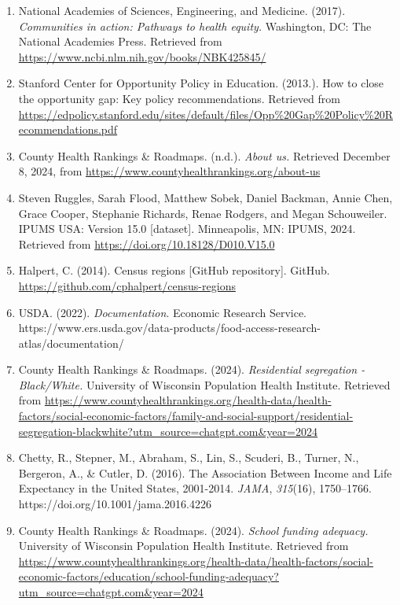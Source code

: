\documentclass[
  10pt,
  letterpaper,
  DIV=11,
  numbers=noendperiod]{scrartcl}
\begin{document}
\begin{enumerate}
\def\labelenumi{\arabic{enumi}.}
\item
  National Academies of Sciences, Engineering, and Medicine. (2017).
  \emph{Communities in action: Pathways to health equity.} Washington,
  DC: The National Academies Press. Retrieved from
  \url{https://www.ncbi.nlm.nih.gov/books/NBK425845/}
\item
  Stanford Center for Opportunity Policy in Education. (2013.). How to
  close the opportunity gap: Key policy recommendations. Retrieved from
  \url{https://edpolicy.stanford.edu/sites/default/files/Opp\%20Gap\%20Policy\%20Recommendations.pdf}
\item
  County Health Rankings \& Roadmaps. (n.d.). \emph{About us.} Retrieved
  December 8, 2024, from
  \url{https://www.countyhealthrankings.org/about-us}
\item
  Steven Ruggles, Sarah Flood, Matthew Sobek, Daniel Backman, Annie
  Chen, Grace Cooper, Stephanie Richards, Renae Rodgers, and Megan
  Schouweiler. IPUMS USA: Version 15.0 {[}dataset{]}. Minneapolis, MN:
  IPUMS, 2024. Retrieved from \url{https://doi.org/10.18128/D010.V15.0}
\item
  Halpert, C. (2014). Census regions {[}GitHub repository{]}. GitHub.
  \url{https://github.com/cphalpert/census-regions}
\item
  USDA. (2022). \emph{Documentation}. Economic Research Service.
  https://www.ers.usda.gov/data-products/food-access-research-atlas/documentation/
\item
  County Health Rankings \& Roadmaps. (2024). \emph{Residential
  segregation - Black/White.} University of Wisconsin Population Health
  Institute. Retrieved from
  \url{https://www.countyhealthrankings.org/health-data/health-factors/social-economic-factors/family-and-social-support/residential-segregation-blackwhite?utm_source=chatgpt.com&year=2024}
\item
  Chetty, R., Stepner, M., Abraham, S., Lin, S., Scuderi, B., Turner,
  N., Bergeron, A., \& Cutler, D. (2016). The Association Between Income
  and Life Expectancy in the United States, 2001-2014. \emph{JAMA},
  \emph{315}(16), 1750--1766. https://doi.org/10.1001/jama.2016.4226
\item
  County Health Rankings \& Roadmaps. (2024). \emph{School funding
  adequacy.} University of Wisconsin Population Health Institute.
  Retrieved from
  \url{https://www.countyhealthrankings.org/health-data/health-factors/social-economic-factors/education/school-funding-adequacy?utm_source=chatgpt.com&year=2024}
\end{enumerate}
\end{document}
